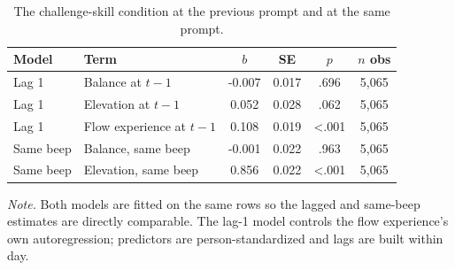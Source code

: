 \begin{table}[!htbp]
\raggedright
\caption{The challenge-skill condition at the previous prompt and at the same prompt.}
\label{tab:sup-condlag}
\footnotesize
\begingroup
\setlength{\tabcolsep}{4pt}
\renewcommand{\arraystretch}{1.08}
\noindent
\begin{tabular*}{\textwidth}{@{\extracolsep{\fill}}llcccc@{}}
\toprule
Model & Term & $b$ & SE & $p$ & $n$ obs \\
\midrule
Lag 1 & Balance at $t-1$ & -0.007 & 0.017 & .696 & 5,065 \\
Lag 1 & Elevation at $t-1$ & 0.052 & 0.028 & .062 & 5,065 \\
Lag 1 & Flow experience at $t-1$ & 0.108 & 0.019 & <.001 & 5,065 \\
Same beep & Balance, same beep & -0.001 & 0.022 & .963 & 5,065 \\
Same beep & Elevation, same beep & 0.856 & 0.022 & <.001 & 5,065 \\
\bottomrule
\end{tabular*}
\par\vspace{3pt}\noindent\parbox{\textwidth}{\footnotesize\textit{Note.} Both models are fitted on the same rows so the lagged and same-beep estimates are directly comparable. The lag-1 model controls the flow experience's own autoregression; predictors are person-standardized and lags are built within day.}
\endgroup
\end{table}
